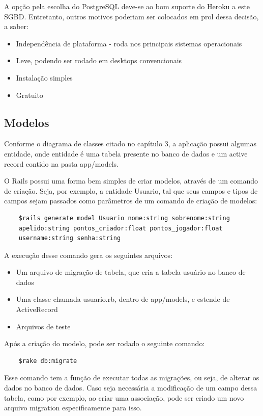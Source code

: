     A opção pela escolha do PostgreSQL deve-se ao bom suporte do Heroku a este \ac{SGBD}. Entretanto, outros motivos poderiam ser colocados em prol dessa decisão, a saber:
\begin{itemize}
\item Independência de plataforma - roda nos principais sistemas operacionais
\item Leve, podendo ser rodado em desktops convencionais
\item Instalação simples
\item Gratuito
\end{itemize}
    \subsection{Modelos}
            Conforme o diagrama de classes citado no capítulo 3, a aplicação possui algumas entidade, onde entidade é uma tabela presente no banco de dados e um active record contido na pasta app/models.
			
            O Rails possui uma forma bem simples de criar modelos, através de um comando de criação. Seja, por exemplo, a entidade Usuario, tal que seus campos e tipos de campos sejam passados como parâmetros de um comando de criação de modelos:
			
\begin{lstlisting}
    $rails generate model Usuario nome:string sobrenome:string 
	apelido:string pontos_criador:float pontos_jogador:float 
	username:string senha:string
\end{lstlisting}
            A execução desse comando gera os seguintes arquivos:
\begin{itemize}
\item Um arquivo de migração de tabela, que cria a tabela usuário no banco de dados
\item Uma classe chamada usuario.rb,  dentro de app/models,  e estende de ActiveRecord
\item Arquivos de teste
\end{itemize}     
    Após a criação do modelo, pode ser rodado o seguinte comando:
	\begin{lstlisting}
    $rake db:migrate
     \end{lstlisting}
    Esse comando tem a função de executar todas as migrações, ou seja, de alterar os dados no banco de dados. Caso seja necessária a modificação de um campo dessa tabela, como por exemplo, ao criar uma associação, pode ser criado um novo arquivo migration especificamente para isso.
	
